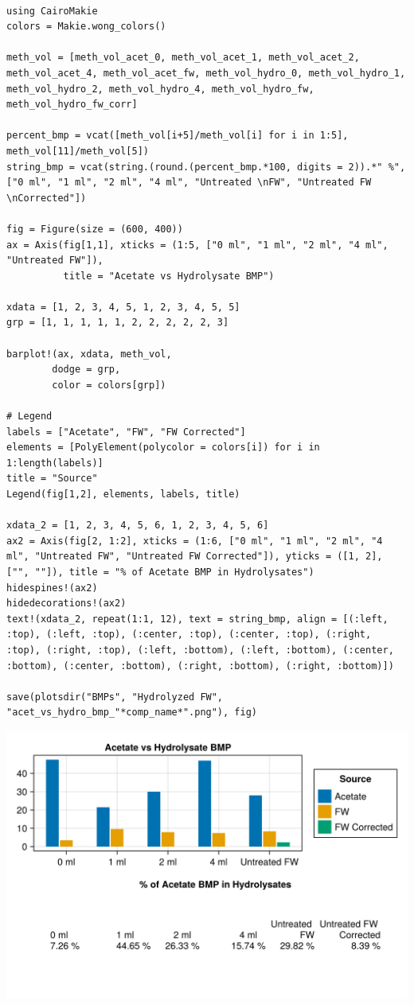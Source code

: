 \documentclass[11pt]{article}
\begin{document}
\begin{verbatim}

using CairoMakie
colors = Makie.wong_colors()

meth_vol = [meth_vol_acet_0, meth_vol_acet_1, meth_vol_acet_2, meth_vol_acet_4, meth_vol_acet_fw, meth_vol_hydro_0, meth_vol_hydro_1, meth_vol_hydro_2, meth_vol_hydro_4, meth_vol_hydro_fw, meth_vol_hydro_fw_corr]

percent_bmp = vcat([meth_vol[i+5]/meth_vol[i] for i in 1:5], meth_vol[11]/meth_vol[5])
string_bmp = vcat(string.(round.(percent_bmp.*100, digits = 2)).*" %", ["0 ml", "1 ml", "2 ml", "4 ml", "Untreated \nFW", "Untreated FW \nCorrected"])

fig = Figure(size = (600, 400))
ax = Axis(fig[1,1], xticks = (1:5, ["0 ml", "1 ml", "2 ml", "4 ml", "Untreated FW"]),
          title = "Acetate vs Hydrolysate BMP")

xdata = [1, 2, 3, 4, 5, 1, 2, 3, 4, 5, 5]
grp = [1, 1, 1, 1, 1, 2, 2, 2, 2, 2, 3]

barplot!(ax, xdata, meth_vol,
        dodge = grp,
        color = colors[grp])

# Legend
labels = ["Acetate", "FW", "FW Corrected"]
elements = [PolyElement(polycolor = colors[i]) for i in 1:length(labels)]
title = "Source"
Legend(fig[1,2], elements, labels, title)

xdata_2 = [1, 2, 3, 4, 5, 6, 1, 2, 3, 4, 5, 6]
ax2 = Axis(fig[2, 1:2], xticks = (1:6, ["0 ml", "1 ml", "2 ml", "4 ml", "Untreated FW", "Untreated FW Corrected"]), yticks = ([1, 2], ["", ""]), title = "% of Acetate BMP in Hydrolysates")
hidespines!(ax2)
hidedecorations!(ax2)
text!(xdata_2, repeat(1:1, 12), text = string_bmp, align = [(:left, :top), (:left, :top), (:center, :top), (:center, :top), (:right, :top), (:right, :top), (:left, :bottom), (:left, :bottom), (:center, :bottom), (:center, :bottom), (:right, :bottom), (:right, :bottom)])

save(plotsdir("BMPs", "Hydrolyzed FW", "acet_vs_hydro_bmp_"*comp_name*".png"), fig)
\end{verbatim}

\begin{center}
\includegraphics[width=.9\linewidth]{../plots/BMPs/Hydrolyzed FW/acet_vs_hydro_bmp_s1_r2.png}
\end{center}
\end{document}
